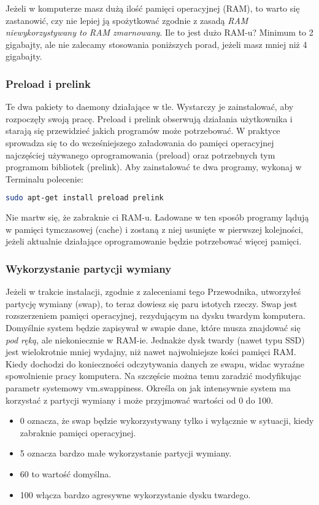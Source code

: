 Jeżeli w komputerze masz dużą ilość pamięci operacyjnej (RAM), to warto się zastanowić, czy nie lepiej ją spożytkować zgodnie z zasadą \emph{RAM niewykorzystywany to RAM zmarnowany}. Ile to jest dużo RAM-u? Minimum to 2 gigabajty, ale nie zalecamy stosowania poniższych porad, jeżeli masz mniej niż 4 gigabajty.

\subsubsection{Preload i prelink}
Te dwa pakiety to daemony działające w tle. Wystarczy je zainstalować, aby rozpoczęły swoją pracę. \textcolor{ubuntu_orange}{Preload i prelink} obserwują działania użytkownika i starają się przewidzieć jakich programów może potrzebować. W praktyce sprowadza się to do wcześniejszego załadowania do pamięci operacyjnej najczęściej używanego oprogramowania (preload) oraz potrzebnych tym programom bibliotek (prelink). Aby zainstalować te dwa programy, wykonaj w Terminalu polecenie:

\begin{lstlisting}[language=bash]
sudo apt-get install preload prelink
\end{lstlisting}

Nie martw się, że zabraknie ci RAM-u. Ładowane w ten sposób programy lądują w pamięci tymczasowej (cache) i zostaną z niej usunięte w pierwszej kolejności, jeżeli aktualnie działające oprogramowanie będzie potrzebować więcej pamięci.

\subsubsection{Wykorzystanie partycji wymiany}
Jeżeli w trakcie instalacji, zgodnie z zaleceniami tego Przewodnika, utworzyłeś partycję wymiany (swap), to teraz dowiesz się paru istotych rzeczy. Swap jest rozszerzeniem pamięci operacyjnej, rezydującym na dysku twardym komputera. Domyślnie system będzie zapisywał w swapie dane, które musza znajdować się \emph{pod ręką}, ale niekoniecznie w RAM-ie. Jednakże dysk twardy (nawet typu SSD) jest wielokrotnie mniej wydajny, niż nawet najwolniejsze kości pamięci RAM. Kiedy dochodzi do konieczności odczytywania danych ze swapu, widac wyraźne spowolnienie pracy komputera. Na szczęście można temu zaradzić modyfikując parametr systemowy \textcolor{ubuntu_orange}{vm.swappiness}. Określa on jak intensywnie system ma korzystać z partycji wymiany i może przyjmować wartości od 0 do 100.

\begin{itemize}
\item \textcolor{ubuntu_orange}{0} oznacza, że swap będzie wykorzystywany tylko i wyłącznie w sytuacji, kiedy zabraknie pamięci operacyjnej.
\item \textcolor{ubuntu_orange}{5} oznacza bardzo małe wykorzystanie partycji wymiany.
\item \textcolor{ubuntu_orange}{60} to wartość domyślna.
\item \textcolor{ubuntu_orange}{100} włącza bardzo agresywne wykorzystanie dysku twardego.
\end{itemize}


